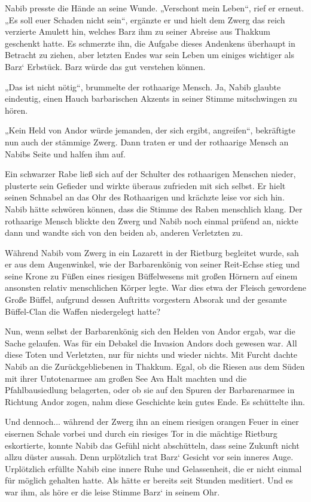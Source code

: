 Nabib presste die Hände an seine Wunde. „Verschont mein Leben“, rief er erneut. „Es soll euer Schaden nicht sein“, ergänzte er und hielt dem Zwerg das reich verzierte Amulett hin, welches Barz ihm zu seiner Abreise aus Thakkum geschenkt hatte. Es schmerzte ihn, die Aufgabe dieses Andenkens überhaupt in Betracht zu ziehen, aber letzten Endes war sein Leben um einiges wichtiger als Barz‘ Erbstück. Barz würde das gut verstehen können.

„Das ist nicht nötig“, brummelte der rothaarige Mensch. Ja, Nabib glaubte eindeutig, einen Hauch barbarischen Akzents in seiner Stimme mitschwingen zu hören.

„Kein Held von Andor würde jemanden, der sich ergibt, angreifen“, bekräftigte nun auch der stämmige Zwerg. Dann traten er und der rothaarige Mensch an Nabibs Seite und halfen ihm auf.

Ein schwarzer Rabe ließ sich auf der Schulter des rothaarigen Menschen nieder, plusterte sein Gefieder und wirkte überaus zufrieden mit sich selbst. Er hielt seinen Schnabel an das Ohr des Rothaarigen und krächzte leise vor sich hin. Nabib hätte schwören können, dass die Stimme des Raben menschlich klang. Der rothaarige Mensch blickte den Zwerg und Nabib noch einmal prüfend an, nickte dann und wandte sich von den beiden ab, anderen Verletzten zu.

Während Nabib vom Zwerg in ein Lazarett in der Rietburg begleitet wurde, sah er aus dem Augenwinkel, wie der Barbarenkönig von seiner Reit-Echse stieg und seine Krone zu Füßen eines riesigen Büffelwesens mit großen Hörnern auf einem ansonsten relativ menschlichen Körper legte. War dies etwa der Fleisch gewordene Große Büffel, aufgrund dessen Auftritts vorgestern Absorak und der gesamte Büffel-Clan die Waffen niedergelegt hatte?

Nun, wenn selbst der Barbarenkönig sich den Helden von Andor ergab, war die Sache gelaufen. Was für ein Debakel die Invasion Andors doch gewesen war. All diese Toten und Verletzten, nur für nichts und wieder nichts. Mit Furcht dachte Nabib an die Zurückgebliebenen in Thakkum. Egal, ob die Riesen aus dem Süden mit ihrer Untotenarmee am großen See Ava Halt machten und die Pfahlbausiedlung belagerten, oder ob sie auf den Spuren der Barbarenarmee in Richtung Andor zogen, nahm diese Geschichte kein gutes Ende. Es schüttelte ihn.

Und dennoch... während der Zwerg ihn an einem riesigen orangen Feuer in einer eisernen Schale vorbei und durch ein riesiges Tor in die mächtige Rietburg eskortierte, konnte Nabib das Gefühl nicht abschütteln, dass seine Zukunft nicht allzu düster aussah. Denn urplötzlich trat Barz‘ Gesicht vor sein inneres Auge. Urplötzlich erfüllte Nabib eine innere Ruhe und Gelassenheit, die er nicht einmal für möglich gehalten hatte. Als hätte er bereits seit Stunden meditiert. Und es war ihm, als höre er die leise Stimme Barz‘ in seinem Ohr.

